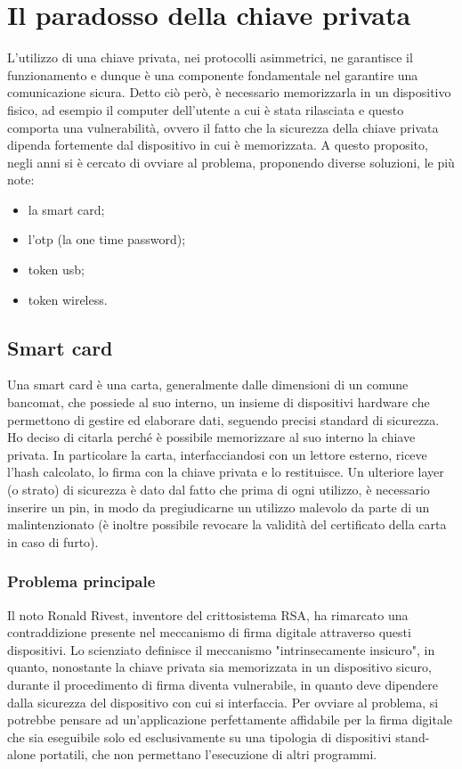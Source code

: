 \section{Il paradosso della chiave privata}

L'utilizzo di una chiave privata, nei protocolli asimmetrici, ne garantisce il funzionamento e dunque è una componente fondamentale nel garantire una comunicazione sicura. Detto ciò però, è necessario memorizzarla in un dispositivo fisico, ad esempio il computer dell'utente a cui è stata rilasciata e questo comporta una vulnerabilità, ovvero il fatto che la sicurezza della chiave privata dipenda fortemente dal dispositivo in cui è memorizzata. A questo proposito, negli anni si è cercato di ovviare al problema, proponendo diverse soluzioni, le più note:
\begin{itemize}
	\item la smart card;
	\item l'otp (la one time password);
	\item token usb;
	\item token wireless.
\end{itemize}

\subsection{Smart card}

Una smart card è una carta, generalmente dalle dimensioni di un comune bancomat, che possiede al suo interno, un insieme di dispositivi hardware che permettono di gestire ed elaborare dati, seguendo precisi standard di sicurezza. Ho deciso di citarla perché è possibile memorizzare al suo interno la chiave privata. In particolare la carta, interfacciandosi con un lettore esterno, riceve l'hash calcolato, lo firma con la chiave privata e lo restituisce. Un ulteriore layer (o strato) di sicurezza è dato dal fatto che prima di ogni utilizzo, è necessario inserire un pin, in modo da pregiudicarne un utilizzo malevolo da parte di un malintenzionato (è inoltre possibile revocare la validità del certificato della carta in caso di furto).

\subsubsection{Problema principale}

Il noto Ronald Rivest, inventore del crittosistema RSA, ha rimarcato una contraddizione presente nel meccanismo di firma digitale attraverso questi dispositivi. Lo scienziato definisce il meccanismo "intrinsecamente insicuro", in quanto, nonostante la chiave privata sia memorizzata in un dispositivo sicuro, durante il procedimento di firma diventa vulnerabile, in quanto deve dipendere dalla sicurezza del dispositivo con cui si interfaccia. Per ovviare al problema, si potrebbe pensare ad un'applicazione perfettamente affidabile per la firma digitale che sia eseguibile solo ed esclusivamente su una tipologia di dispositivi stand-alone portatili, che non permettano l'esecuzione di altri programmi.

